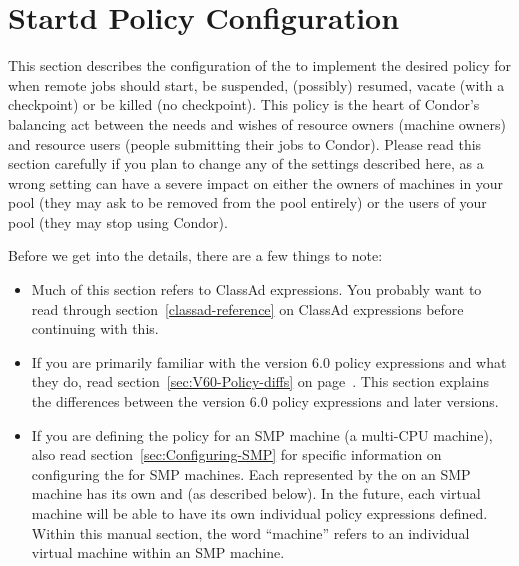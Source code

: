 
\section{\label{sec:Configuring-Policy}
Startd Policy Configuration}

This section describes the configuration of the  to
implement the desired policy for when remote jobs should start, be
suspended, (possibly) resumed, vacate (with a checkpoint) or be killed
(no checkpoint).
This policy is the heart of Condor's balancing act
between the needs and wishes of resource owners (machine owners) and
resource users (people submitting their jobs to Condor).
Please read
this section carefully if you plan to change any of the settings
described here, as a wrong setting can have a severe impact on
either the owners of machines in your pool (they may
ask to be removed from the pool entirely) or the users of your pool
(they may stop using Condor).

Before we get into the details, there are a few things to note:
\begin{itemize}
\item Much of this section refers to ClassAd expressions.  You
probably want to read through section~\ref{classad-reference} on
ClassAd expressions before continuing with this.

\item If you are primarily familiar with the version 6.0 policy
expressions and what they do, read
section~\ref{sec:V60-Policy-diffs} on
page~\pageref{sec:V60-Policy-diffs}.  This section explains the differences
between the version 6.0 policy expressions and later versions.  

\item If you are defining the policy for an SMP machine
(a multi-CPU machine),
also read section~\ref{sec:Configuring-SMP} for specific information on
configuring the  for SMP machines.  
Each  represented by the  on an
SMP machine has its own  and 
(as described below). 
In the future, each virtual machine will be able to have its
own individual policy expressions defined.
Within this manual section, the word ``machine''
refers to an individual virtual machine within
an SMP machine.
\end{itemize}


